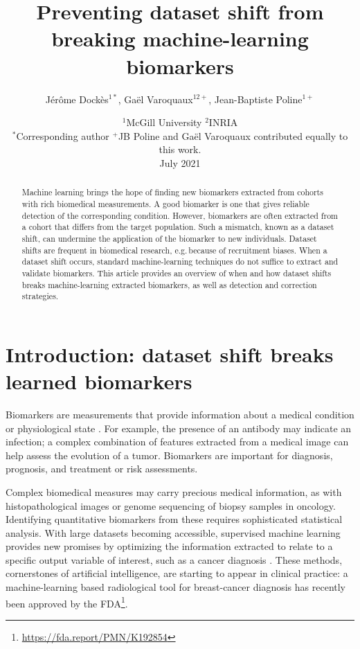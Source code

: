 \documentclass[twocolumn]{article}
\title{Preventing dataset shift from breaking machine-learning
biomarkers}
\author{Jérôme Dockès$^{1*}$, Gaël Varoquaux$^{12+}$, Jean-Baptiste Poline$^{1+}$}
\date{$^1$McGill University $^2$INRIA \\ $^*$Corresponding author $^+$JB Poline and Gaël Varoquaux contributed equally to this work.  \vspace{20pt} \\ July 2021}
\newcommand{\eg}{e.g.\,}
\begin{document}
\maketitle

\begin{abstract}
  Machine learning brings the hope of finding new biomarkers extracted
  from cohorts with rich biomedical measurements. A good biomarker is one
  that gives reliable detection of the corresponding condition.
  However, biomarkers are often extracted from a cohort that differs
  from the target population. Such a
  mismatch, known as a dataset shift, can undermine the application of the
  biomarker to new individuals.
  Dataset shifts are frequent in biomedical research, \eg because of recruitment biases.
  When a dataset shift occurs, standard machine-learning techniques do not
  suffice to extract and validate biomarkers. This article provides an overview
  of when and how dataset shifts breaks machine-learning extracted
  biomarkers, as well as detection and correction strategies.
\end{abstract}


\section{Introduction: dataset shift breaks learned biomarkers}
Biomarkers are measurements that provide information about a medical condition
or physiological state \citep{strimbu2010biomarkers}. For example, the presence
of an antibody may indicate an infection; a complex combination of features
extracted from a medical image can help assess the evolution of a tumor.
%
Biomarkers are important for diagnosis, prognosis, and treatment
or risk assessments.


Complex biomedical measures may carry precious medical information,
as with histopathological images or genome sequencing of biopsy samples in
oncology. Identifying quantitative biomarkers from these requires
sophisticated statistical analysis. With large datasets becoming
accessible, supervised machine learning provides new promises by
optimizing the information extracted to relate to a specific output variable of
interest, such as a cancer diagnosis
\citep{andreu2015big,faust2018deep,deo2015machine}. These methods,
cornerstones of artificial intelligence, are starting to
appear in clinical practice: a machine-learning based radiological tool
for breast-cancer diagnosis has recently been approved by the
FDA\footnote{\url{https://fda.report/PMN/K192854}}.
\end{document}

